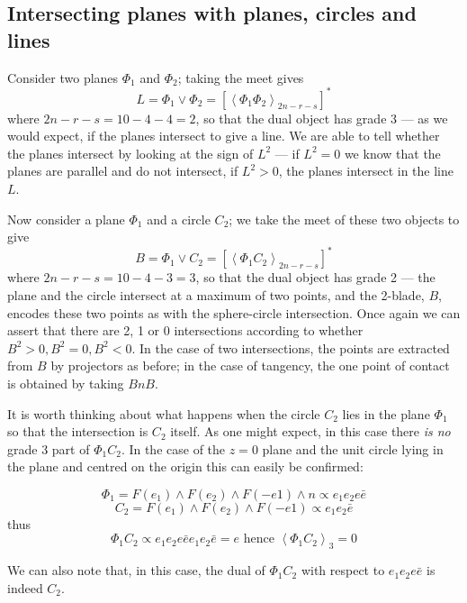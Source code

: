\subsection{Intersecting planes with planes, circles and lines }

Consider two planes $\Phi_1$ and $\Phi_2$; taking the
meet gives
%
\begin{equation}
L = \Phi_1 \vee \Phi_2 = \left[\left< \Phi_1 \Phi_2
\right>_{2n-r-s}\right]^*
\end{equation}
%
where $2n-r-s=10-4-4=2$, so that the dual object has
grade 3 --- as we would expect, if the planes intersect to
give a line. We are able to tell whether the planes
intersect by looking at the sign of $L^2$ --- if $L^2=0$
we know that the planes are parallel and do not
intersect, if $L^2>0$, the planes intersect in the line
$L$.

Now consider a plane $\Phi_1$ and a circle $C_2$; we take
the meet of these two objects to give
%
\begin{equation}
B = \Phi_1 \vee C_2 = \left[\left< \Phi_1 C_2
\right>_{2n-r-s}\right]^*
\end{equation}
%
where $2n-r-s=10-4-3=3$, so that the dual object has
grade 2 --- the plane and the circle intersect at a
maximum of two points, and the 2-blade, $B$, encodes these
two points as with the sphere-circle intersection. Once
again we can assert that there are 2, 1 or 0 intersections
according to whether $B^2>0, B^2=0, B^2<0$. In the case of
two intersections, the points are extracted from $B$ by
projectors as before; in the case of tangency, the
one point of contact is obtained by taking $BnB$.

It is worth thinking about what happens when the circle
$C_2$ lies in the plane $\Phi_1$ so that the intersection is
$C_2$ itself. As one might expect, in this case there \emph{is
no} grade 3 part of $\Phi_1C_2$. In the case of the $z=0$ plane and
the unit circle lying in the plane and centred on the origin this can
easily be confirmed:

\[
\Phi_1 = F(e_1) \wedge F(e_2) \wedge F(-e1) \wedge n \propto e_1e_2e\bar{e}
\]
\[
C_2 = F(e_1) \wedge F(e_2) \wedge F(-e1) \propto e_1e_2\bar{e}
\]
thus
\[
\Phi_1C_2 \propto e_1e_2e\bar{e}e_1e_2\bar{e} = e \mbox{ hence }
\left<\Phi_1C_2\right>_3 = 0
\]

We can also note that, in this case, the dual of $\Phi_1C_2$ with respect to
$e_1e_2e\bar{e}$ is indeed $C_2$.

